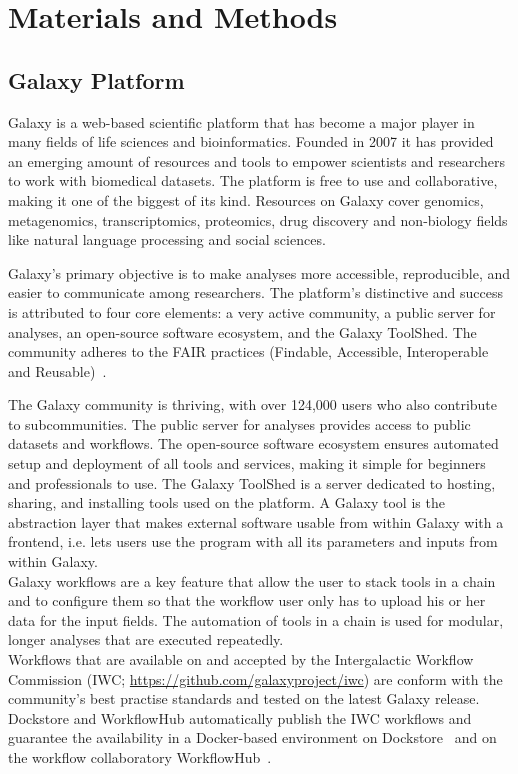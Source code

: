 \chapter{Materials and Methods}\label{chap:methods}

\section{Galaxy Platform}\label{sec:galaxy}
Galaxy is a web-based scientific platform that has become a major player in many fields of life sciences and bioinformatics. Founded in 2007 it has provided an emerging amount of resources and tools to empower scientists and researchers to work with biomedical datasets. The platform is free to use and collaborative, making it one of the biggest of its kind. Resources on Galaxy cover genomics, metagenomics, transcriptomics, proteomics, drug discovery and non-biology fields like natural language processing and social sciences.

Galaxy's primary objective is to make analyses more accessible, reproducible, and easier to communicate among researchers. The platform's distinctive and success is attributed to four core elements: a very active community, a public server for analyses, an open-source software ecosystem, and the Galaxy ToolShed. The community adheres to the FAIR practices (Findable, Accessible, Interoperable and Reusable)~\cite{10.1093/nar/gkac247}.

The Galaxy community is thriving, with over 124,000 users who also contribute to subcommunities. The public server for analyses provides access to public datasets and workflows. The open-source software ecosystem ensures automated setup and deployment of all tools and services, making it simple for beginners and professionals to use. The Galaxy ToolShed is a server dedicated to hosting, sharing, and installing tools used on the platform. A Galaxy tool is the abstraction layer that makes external software usable from within Galaxy with a frontend, i.e. lets users use the program with all its parameters and inputs from within Galaxy. \\ 
Galaxy workflows are a key feature that allow the user to stack tools in a chain and to configure them so that the workflow user only has to upload his or her data for the input fields. The automation of tools in a chain is used for modular, longer analyses that are executed repeatedly. \\
Workflows that are available on and accepted by the Intergalactic Workflow Commission (IWC; \url{https://github.com/galaxyproject/iwc}) are conform with the community's best practise standards and tested on the latest Galaxy release. Dockstore and WorkflowHub automatically publish the IWC workflows and guarantee the availability in a Docker-based environment on Dockstore~\cite{o2017dockstore} and on the workflow collaboratory WorkflowHub~\cite{goble2021implementing}.

